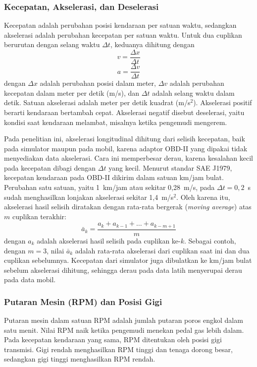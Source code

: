 \subsubsection{Kecepatan, Akselerasi, dan Deselerasi}
Kecepatan adalah perubahan posisi kendaraan per satuan waktu, sedangkan akselerasi adalah perubahan kecepatan per satuan waktu. Untuk dua cuplikan berurutan dengan selang waktu $\Delta t$, keduanya dihitung dengan
\begin{equation}
  v = \frac{\Delta x}{\Delta t}
  \label{eq:kecepatan}
\end{equation}
\begin{equation}
  a = \frac{\Delta v}{\Delta t}
  \label{eq:akselerasi}
\end{equation}
dengan $\Delta x$ adalah perubahan posisi dalam meter, $\Delta v$ adalah perubahan kecepatan dalam meter per detik (m/s), dan $\Delta t$ adalah selang waktu dalam detik. Satuan akselerasi adalah meter per detik kuadrat (m/s$^{2}$). Akselerasi positif berarti kendaraan bertambah cepat. Akselerasi negatif disebut deselerasi, yaitu kondisi saat kendaraan melambat, misalnya ketika pengemudi mengerem.

Pada penelitian ini, akselerasi longitudinal dihitung dari selisih kecepatan, baik pada simulator maupun pada mobil, karena adaptor OBD-II yang dipakai tidak menyediakan data akselerasi. Cara ini memperbesar derau, karena kesalahan kecil pada kecepatan dibagi dengan $\Delta t$ yang kecil. Menurut standar SAE J1979, kecepatan kendaraan pada OBD-II dikirim dalam satuan km/jam bulat. Perubahan satu satuan, yaitu 1~km/jam atau sekitar 0,28~m/s, pada $\Delta t = 0{,}2$~s sudah menghasilkan lonjakan akselerasi sekitar 1,4~m/s$^{2}$. Oleh karena itu, akselerasi hasil selisih diratakan dengan rata-rata bergerak (\textit{moving average}) atas $m$ cuplikan terakhir:
\begin{equation}
  \bar{a}_{k} = \frac{a_{k} + a_{k-1} + \dots + a_{k-m+1}}{m}
  \label{eq:moving-average}
\end{equation}
dengan $a_{k}$ adalah akselerasi hasil selisih pada cuplikan ke-$k$. Sebagai contoh, dengan $m = 3$, nilai $\bar{a}_{k}$ adalah rata-rata akselerasi dari cuplikan saat ini dan dua cuplikan sebelumnya. Kecepatan dari simulator juga dibulatkan ke km/jam bulat sebelum akselerasi dihitung, sehingga derau pada data latih menyerupai derau pada data mobil.

\subsubsection{Putaran Mesin (RPM) dan Posisi Gigi}
Putaran mesin dalam satuan RPM adalah jumlah putaran poros engkol dalam satu menit. Nilai RPM naik ketika pengemudi menekan pedal gas lebih dalam. Pada kecepatan kendaraan yang sama, RPM ditentukan oleh posisi gigi transmisi. Gigi rendah menghasilkan RPM tinggi dan tenaga dorong besar, sedangkan gigi tinggi menghasilkan RPM rendah.

